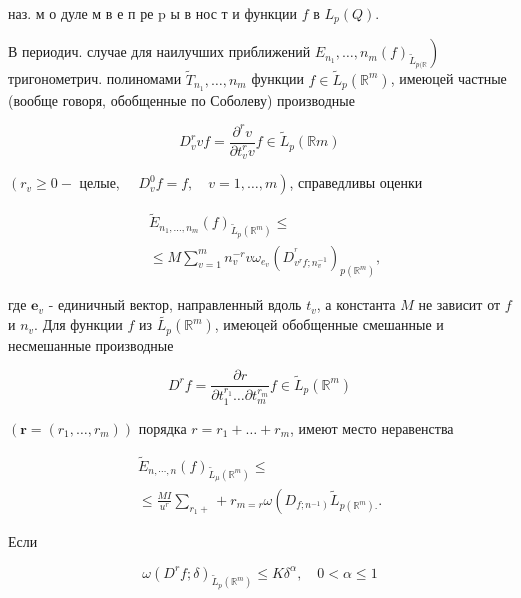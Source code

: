 \documentclass[10pt]{article}
\begin{document}
наз. м о дуле м в е п ре $\mathrm{p}$ ы в нос т и функции $f$ в $L_{p}(Q)$.



В периодич. случае для наилучших приближений $\left.E_{n_{1}}, \ldots, n_{m}(f)_{\tilde{L}_{p(\mathbb{R}}}\right) \quad$ тригонометрич. полиномами $\tilde{T}_{n_{1}}, \ldots, n_{m}$ функции $f \in \tilde{L}_{p}\left(\mathbb{R}^{m}\right)$, имеюцей частные (вообще говоря, обобщенные по Соболеву) производные



\[

D_{v}^{r} v f=\frac{\partial^{r} v}{\partial t_{v}^{r} v} f \in \tilde{L}_{p}(\mathbb{R} m)

\]



$\left(r_{v} \geqslant 0-\right.$ целые, $\left.\quad D_{v}^{0} f=f, \quad v=1, \ldots, m\right)$, справедливы оценки



\[

\begin{aligned}

& \tilde{E}_{n_{1}, \ldots, n_{m}}(f)_{\tilde{L}_{p}\left(\mathbb{R}^{m}\right)} \leqslant \\

& \leqslant M \sum_{v=1}^{m} n_{v}^{-r} v \omega_{e_{v}}\left(D_{v^{r} f ; n_{v}^{-1}}^{{ }^{r}}\right)_{p\left(\mathbb{R}^{m}\right)},

\end{aligned}

\]



где $\boldsymbol{e}_{v}$ - единичный вектор, направленный вдоль $t_{v}$, а константа $M$ не зависит от $f$ и $n_{v}$. Для функции $f$ из $\tilde{L_{p}}\left(\mathbb{R}^{m}\right)$, имеюцей обобщенные смешанные и несмешанные производные



\[

D^{r} f=\frac{\partial r}{\partial t_{1}^{r_{1}} \ldots \partial t_{m}^{r_{m}}} f \in \tilde{L}_{p}\left(\mathbb{R}^{m}\right)

\]



$\left(\boldsymbol{r}=\left(r_{1}, \ldots, r_{m}\right)\right)$ порядка $r=r_{1}+\ldots+r_{m}$, имеют место неравенства



\[

\begin{gathered}

\tilde{E}_{n, \cdots, n}(f)_{\tilde{L}_{\mu}\left(\mathbb{R}^{m}\right)} \leqslant \\

\leqslant \frac{M I}{u^{r}} \sum_{r_{1}+}+r_{m=r} \omega\left(D_{\left.f ; n^{-1}\right)} \tilde{L}_{p\left(\mathbb{R}^{m}\right) .} .\right.

\end{gathered}

\]



Если



\[

\omega\left(D^{r} f ; \delta\right)_{\tilde{L}_{p}\left(\mathbb{R}^{m}\right)} \leqslant K \delta^{\alpha}, \quad 0<\alpha \leqslant 1

\]
\end{document}
